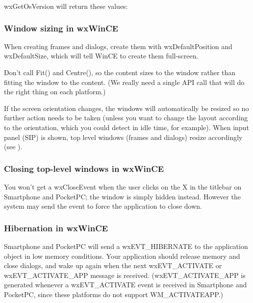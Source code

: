 wxGetOsVersion will return these values:

\begin{twocollist}\itemsep=0pt
\end{twocollist}

\subsubsection{Window sizing in wxWinCE}

When creating frames and dialogs, create them with wxDefaultPosition and
wxDefaultSize, which will tell WinCE to create them full-screen.

Don't call Fit() and Centre(), so the content sizes to
the window rather than fitting the window to the content. (We really need a single API call
that will do the right thing on each platform.)

If the screen orientation changes, the windows will automatically be resized
so no further action needs to be taken (unless you want to change the layout
according to the orientation, which you could detect in idle time, for example).
When input panel (SIP) is shown, top level windows (frames and dialogs) resize
accordingly (see ).

\subsubsection{Closing top-level windows in wxWinCE}

You won't get a wxCloseEvent when the user clicks on the X in the titlebar
on Smartphone and PocketPC; the window is simply hidden instead. However the system may send the
event to force the application to close down.

\subsubsection{Hibernation in wxWinCE}

Smartphone and PocketPC will send a wxEVT\_HIBERNATE to the application object in low
memory conditions. Your application should release memory and close dialogs,
and wake up again when the next wxEVT\_ACTIVATE or wxEVT\_ACTIVATE\_APP message is received.
(wxEVT\_ACTIVATE\_APP is generated whenever a wxEVT\_ACTIVATE event is received
in Smartphone and PocketPC, since these platforms do not support WM\_ACTIVATEAPP.)

